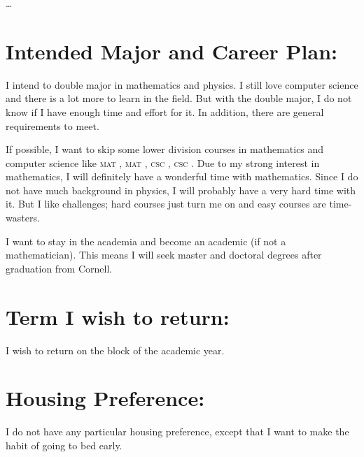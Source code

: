 	\dots
	
	\section*{Intended Major and Career Plan:}
	I intend to double major in mathematics and physics. I still love computer science and there is a lot more to learn in the field. But with the double major, I do not know if I have enough time and effort for it. In addition, there are general requirements to meet.
	
	If possible, I want to skip some lower division courses in mathematics and computer science like \textsc{mat} , \textsc{mat} , \textsc{csc} , \textsc{csc} . Due to my strong interest in mathematics, I will definitely have a wonderful time with mathematics. Since I do not have much background in physics, I will probably have a very hard time with it. But I like challenges; hard courses just turn me on and easy courses are time-wasters.
	
	I want to stay in the academia and become an academic (if not a mathematician). This means I will seek master and doctoral degrees after graduation from Cornell.
	
	\section*{Term I wish to return:}
	I wish to return on the block  of the  academic year.
	
	\section*{Housing Preference:}
	I do not have any particular housing preference, except that I want to make the habit of going to bed early.
	
	\nocite{*}
	
	\clearpage
	
	\printbibliography
